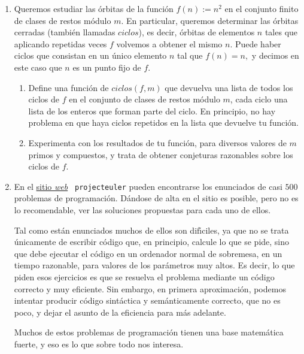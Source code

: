 \begin{enumerate}
\item Queremos estudiar las órbitas de la función $f(n):=n^2$ en el conjunto finito de clases de restos módulo $m$. En particular, queremos determinar las órbitas cerradas (también llamadas $ciclos$),  es decir, órbitas de elementos $n$ tales que aplicando repetidas veces $f$ volvemos a obtener el mismo  $n$. Puede haber ciclos que consistan en un único elemento $n$ tal que $f(n)=n,$ y decimos en este caso que $n$ es un punto fijo de $f$.
\begin{enumerate}
 \item    Define una función de {\sage}  $ciclos(f,m)$ que devuelva una lista de todos los ciclos de $f$ en  el conjunto  de clases de restos módulo $m$, cada ciclo una lista de los enteros que forman parte del ciclo. En principio, no hay problema en que haya ciclos repetidos en la lista que devuelve tu función. 
  \item   Experimenta con los resultados de tu función, para diversos valores de $m$ primos y compuestos,  y trata de obtener conjeturas razonables sobre los ciclos de $f$.

\end{enumerate}







\item En el \href{http://projecteuler.net/}{sitio {\itshape web}} {\tt
projecteuler} pueden encontrarse los enunciados de casi $500$ problemas de
programaci\'on. D\'andose de alta en el sitio es posible, pero no es lo
recomendable,  ver las soluciones
propuestas para cada uno de ellos.  

Tal como est\'an enunciados muchos de ellos son dif\'{\i}ciles, ya que no se
trata \'unicamente de escribir c\'odigo que, en principio, calcule lo que se
pide, sino que debe ejecutar el c\'odigo en un ordenador normal de sobremesa, 
en un tiempo razonable, para valores de los par\'ametros muy altos. Es decir, lo
que piden esos ejercicios es que se resuelva el problema mediante un c\'odigo
correcto y muy eficiente. Sin embargo, en primera aproximaci\'on, podemos
intentar producir c\'odigo sint\'actica y sem\'anticamente correcto, que no es
poco, y dejar el asunto de la eficiencia para m\'as adelante. 

Muchos de estos problemas de programaci\'on tienen una base matem\'atica fuerte,
y eso es lo que sobre todo nos interesa.

\begin{enumerate}


\end{enumerate}
\end{enumerate}
